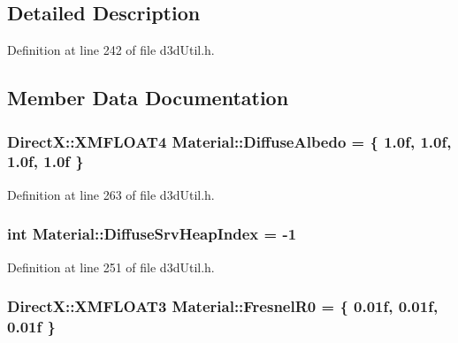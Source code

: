 \subsection{Detailed Description}


Definition at line 242 of file d3d\+Util.\+h.



\subsection{Member Data Documentation}
\subsubsection[{\texorpdfstring{Diffuse\+Albedo}{DiffuseAlbedo}}]{\setlength{\rightskip}{0pt plus 5cm}Direct\+X\+::\+X\+M\+F\+L\+O\+A\+T4 Material\+::\+Diffuse\+Albedo = \{ 1.\+0f, 1.\+0f, 1.\+0f, 1.\+0f \}}\hypertarget{struct_material_a35fea10a83b154ec1e16d083e2d4e41f_a35fea10a83b154ec1e16d083e2d4e41f}{}\label{struct_material_a35fea10a83b154ec1e16d083e2d4e41f_a35fea10a83b154ec1e16d083e2d4e41f}


Definition at line 263 of file d3d\+Util.\+h.

\subsubsection[{\texorpdfstring{Diffuse\+Srv\+Heap\+Index}{DiffuseSrvHeapIndex}}]{\setlength{\rightskip}{0pt plus 5cm}int Material\+::\+Diffuse\+Srv\+Heap\+Index = -\/1}\hypertarget{struct_material_ae0af64dd847942c26368b71faefe747e_ae0af64dd847942c26368b71faefe747e}{}\label{struct_material_ae0af64dd847942c26368b71faefe747e_ae0af64dd847942c26368b71faefe747e}


Definition at line 251 of file d3d\+Util.\+h.

\subsubsection[{\texorpdfstring{Fresnel\+R0}{FresnelR0}}]{\setlength{\rightskip}{0pt plus 5cm}Direct\+X\+::\+X\+M\+F\+L\+O\+A\+T3 Material\+::\+Fresnel\+R0 = \{ 0.\+01f, 0.\+01f, 0.\+01f \}}\hypertarget{struct_material_afa0eeacfe7ed75af247eb08edb14d7b8_afa0eeacfe7ed75af247eb08edb14d7b8}{}\label{struct_material_afa0eeacfe7ed75af247eb08edb14d7b8_afa0eeacfe7ed75af247eb08edb14d7b8}


